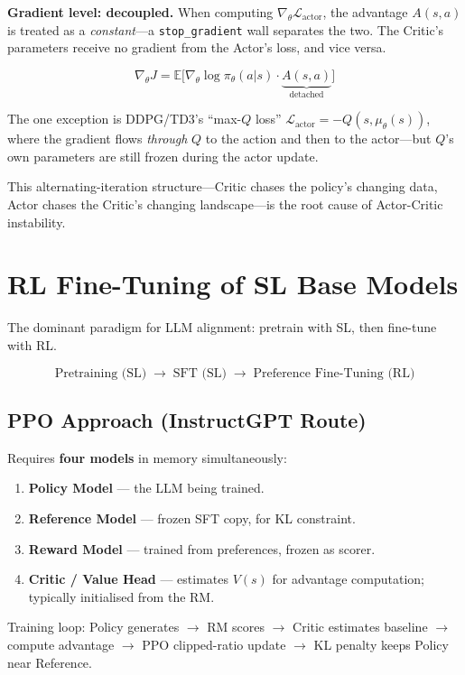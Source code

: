 \textbf{Gradient level: decoupled.}
When computing $\nabla_\theta \mathcal{L}_{\text{actor}}$, the advantage $A(s,a)$ is treated as a \emph{constant}---a \texttt{stop\_gradient} wall separates the two.
The Critic's parameters receive no gradient from the Actor's loss, and vice versa.

\[
  \nabla_\theta J = \mathbb{E}\!\bigl[\nabla_\theta \log\pi_\theta(a|s)\cdot \underbrace{A(s,a)}_{\text{detached}}\bigr]
\]

The one exception is DDPG/TD3's ``max-$Q$ loss'' $\mathcal{L}_{\text{actor}} = -Q(s,\mu_\theta(s))$, where the gradient flows \emph{through} $Q$ to the action and then to the actor---but $Q$'s own parameters are still frozen during the actor update.

This alternating-iteration structure---Critic chases the policy's changing data, Actor chases the Critic's changing landscape---is the root cause of Actor-Critic instability.

\section{RL Fine-Tuning of SL Base Models}
\label{sec:rl-finetune}

The dominant paradigm for LLM alignment: pretrain with SL, then fine-tune with RL.

\[
  \text{Pretraining (SL)} \;\to\; \text{SFT (SL)} \;\to\; \text{Preference Fine-Tuning (RL)}
\]

\subsection{PPO Approach (InstructGPT Route)}

Requires \textbf{four models} in memory simultaneously:
\begin{enumerate}
  \item \textbf{Policy Model} --- the LLM being trained.
  \item \textbf{Reference Model} --- frozen SFT copy, for KL constraint.
  \item \textbf{Reward Model} --- trained from preferences, frozen as scorer.
  \item \textbf{Critic / Value Head} --- estimates $V(s)$ for advantage computation; typically initialised from the RM.
\end{enumerate}

Training loop: Policy generates $\to$ RM scores $\to$ Critic estimates baseline $\to$ compute advantage $\to$ PPO clipped-ratio update $\to$ KL penalty keeps Policy near Reference.

